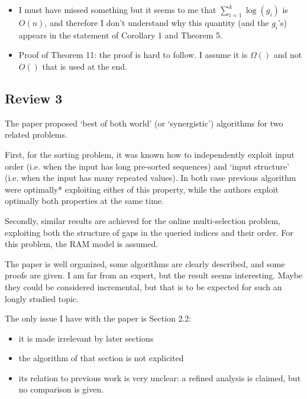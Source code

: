 \begin{appendices}
\begin{itemize}
  \item I must have missed something but it seems to me that
    $\sum_{i=1}^k \log(g_i)$ is $O(n)$, and therefore I don't understand
    why this quantity (and the $g_i$'s) appears in the statement of
    Corollary 1 and Theorem 5.
    
  \item Proof of Theorem 11: the proof is hard to follow. I assume it
    is $\Omega()$ and not $O()$ that is used at the end.
  \end{itemize}
  
  \subsection{Review 3}

  The paper proposed `best of both world' (or `synergistic')
  algorithms for two related problems.

  First, for the sorting problem, it was known how to independently
  exploit input order (i.e. when the input has long pre-sorted
  sequences) and `input structure' (i.e. when the input has many
  repeated values). In both case previous algorithm were optimally*
  exploiting either of this property, while the authors exploit
  optimally both properties at the same time.

  Secondly, similar results are achieved for the online
  multi-selection problem, exploiting both the structure of gaps in
  the queried indices and their order. For this problem, the RAM model
  is assumed.

  The paper is well organized, some algorithms are clearly described,
  and some proofs are given. I am far from an expert, but the result
  seems interesting. Maybe they could be considered incremental, but
  that is to be expected for such an longly studied topic.

  The only issue I have with the paper is Section 2.2:

  \begin{itemize}
  \item it is made irrelevant by later sections
    
  \item the algorithm of that section is not explicited
    
  \item its relation to previous work is very unclear: a refined
    analysis is claimed, but no comparison is given.
  \end{itemize}
  

\end{appendices}
